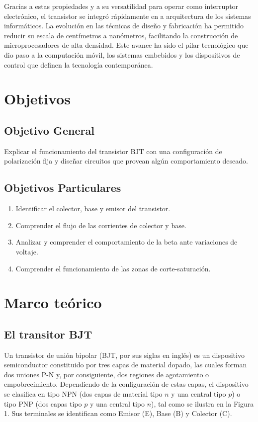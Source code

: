 \documentclass[journal]{IEEEtran}
\begin{document}
    Gracias a estas propiedades y a su versatilidad para operar como interruptor electrónico, el transistor se integró rápidamente en 
    a arquitectura de los sistemas informáticos. La evolución en las técnicas de diseño y fabricación ha permitido reducir su escala de 
    centímetros a nanómetros, facilitando la construcción de microprocesadores de alta densidad. Este avance ha sido el pilar tecnológico 
    que dio paso a la computación móvil, los sistemas embebidos y los dispositivos de control que definen la tecnología contemporánea.

\section{Objetivos}
    \subsection{Objetivo General}
    Explicar el funcionamiento del transistor BJT con una configuración de polarización fija y  diseñar circuitos que provean algún comportamiento deseado.

    \subsection{Objetivos Particulares}
    \begin{enumerate}
        \item Identificar el colector, base y emisor del transistor.
        \item Comprender el flujo de las corrientes de colector y base.
        \item Analizar y comprender el comportamiento de la beta ante variaciones de voltaje. 
        \item Comprender el funcionamiento de las zonas de corte-saturación.
    \end{enumerate}

\section{Marco teórico}
    \subsection{El transitor BJT}
        Un transistor de unión bipolar (BJT, por sus siglas en inglés) es un dispositivo semiconductor 
        constituido por tres capas de material dopado, las cuales forman dos uniones P-N y, por consiguiente, 
        dos regiones de agotamiento o empobrecimiento. Dependiendo de la configuración de estas capas, 
        el dispositivo se clasifica en tipo NPN (dos capas de material tipo $n$ y una central tipo $p$) 
        o tipo PNP (dos capas tipo $p$ y una central tipo $n$), tal como se ilustra en la Figura 1. 
        Sus terminales se identifican como Emisor (E), Base (B) y Colector (C).
        
\end{document}
